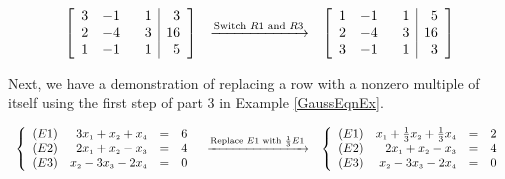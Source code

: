\[\begin{array}{ccc}

\left[ \begin{array}{rrr|r} 
3 & -1 & \hphantom{-}1 & 3 \\ 
2 & -4 & 3 & 16 \\ 
1 & -1 & 1 & 5  \\
\end{array} \right]

&
\xrightarrow{\text{Switch $R1$ and $R3$}}

&

\left[ \begin{array}{rrr|r} 
1 & -1 & \hphantom{-}1 & 5  \\
2 & -4 & 3 & 16 \\ 
3 & -1 & 1 & 3 \\ 

\end{array} \right]

\end{array}\]

Next, we have a demonstration of replacing a row with a nonzero multiple of itself using the first step of part 3 in Example \ref{GaussEqnEx}.

 \[\begin{array}{ccc}

\left\{ 

\begin{array}{lrcr}

(E1) & 3x_{\mbox{\tiny$1$}} +x_{\mbox{\tiny$2$}} + x_{\mbox{\tiny$4$}} & = & 6 \\   
(E2) & 2x_{\mbox{\tiny$1$}} + x_{\mbox{\tiny$2$}} -x_{\mbox{\tiny$3$}}  & = & 4  \\
(E3) &  x_{\mbox{\tiny$2$}} -3x_{\mbox{\tiny$3$}} -2x_{\mbox{\tiny$4$}} & = & 0 \\

\end{array} 

\right.

&
\xrightarrow{\text{Replace $E1$ with $\frac{1}{3}E1$}}

&

\left\{ 

\begin{array}{lrcr}

(E1) & x_{\mbox{\tiny$1$}} + \frac{1}{3}x_{\mbox{\tiny$2$}} + \frac{1}{3}x_{\mbox{\tiny$4$}} & = & 2 \\  
(E2) & 2x_{\mbox{\tiny$1$}} + x_{\mbox{\tiny$2$}} -x_{\mbox{\tiny$3$}}  & = & 4  \\
(E3) &  x_{\mbox{\tiny$2$}} -3x_{\mbox{\tiny$3$}} -2x_{\mbox{\tiny$4$}} & = & 0 \\

\end{array} 

\right.

\end{array}\]

